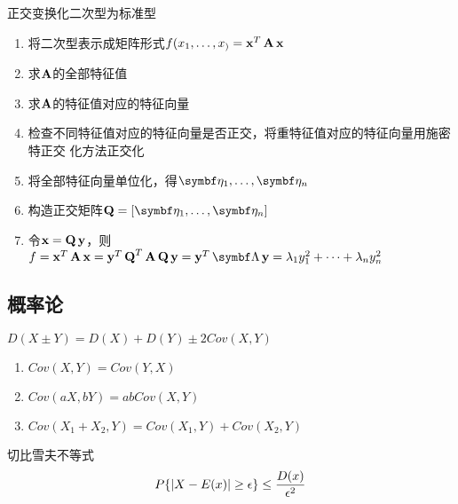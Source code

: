 \documentclass{article}
\begin{document}
正交变换化二次型为标准型
\begin{enumerate}
\item 将二次型表示成矩阵形式\(f(x_1,\dots,x_)=\operatorname{\textbf{x}}^T\operatorname{\textbf{A}}\operatorname{\textbf{x}}\)
\item 求\(\operatorname{\textbf{A}}\)的全部特征值
\item 求\(\operatorname{\textbf{A}}\)的特征值对应的特征向量
\item 检查不同特征值对应的特征向量是否正交，将重特征值对应的特征向量用施密特正交
化方法正交化
\item 将全部特征向量单位化，得\(\boldeta_1,\dots,\boldeta_n\)
\item 构造正交矩阵\(\bQ=[\boldeta_1,\dots,\boldeta_n]\)
\item 令\(\operatorname{\textbf{x}}=\operatorname{\textbf{Q}}\operatorname{\textbf{y}}\)，则\(f=\bx^T\bA\bx=\by^T\bQ^T\bA\bQ\by=\by^T\bLambda\by=
      \lambda_1y_1^2+\dots+\lambda_ny_n^2\)
\end{enumerate}

\subsection{概率论}
\label{sec:org93cb949}
\(D(X\pm Y)=D(X)+D(Y)\pm2Cov(X,Y)\)

\begin{enumerate}
\item \(Cov(X,Y)=Cov(Y,X)\)
\item \(Cov(aX,bY)=abCov(X,Y)\)
\item \(Cov(X_1+X_2,Y)=Cov(X_1,Y)+Cov(X_2,Y)\)
\end{enumerate}


切比雪夫不等式
\begin{equation*}
P\{\abs{X-E(x)}\ge\epsilon\}\le\frac{D(x)}{\epsilon^2}
\end{equation*}
\end{document}
